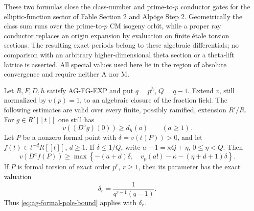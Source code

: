 These two formulas close the class-number and prime-to-$p$
conductor gates for the elliptic-function sector of Fable
Section 2 and Alp\"oge Step 2. Geometrically the class sum
runs over the prime-to-$p$ CM isogeny orbit, while a proper
ray conductor replaces an origin expansion by evaluation on
finite \'etale torsion sections. The resulting exact periods
belong to these algebraic differentials; no comparison with
an arbitrary higher-dimensional theta section or a theta-lift
lattice is asserted. All special values used here lie in the
region of absolute convergence and require neither A nor M.

\begin{proposition}
Let $R,F,D,h$ satisfy AG-FG-EXP and put $q=p^h$, $Q=q-1$.
Extend $v$, still normalized by $v(p)=1$, to an algebraic closure
of the fraction field. The following estimates are valid over
every finite, possibly ramified, extension $R'/R$.
For $g\in R'[[t]]$ one still has
\[
 v((D^ag)(0))\ge d_h(a)\qquad(a\ge1).
\]
Let $P$ be a nonzero formal point with $\delta=v(t(P))>0$,
and let $f(t)\in t^{-d}R[[t]]$, $d\ge1$. If
$\delta\le1/Q$, write $a-1=\kappa Q+\eta$,
$0\le\eta<Q$. Then
\begin{equation}\label{eq:ag-formal-pole-bound}
 v(D^af(P))\ge
 \max\left\{-(a+d)\delta,\quad
       v_p(a!)-\kappa-(\eta+d+1)\delta\right\}.
\end{equation}
If $P$ is formal torsion of exact order $p^r$, $r\ge1$,
then its parameter has the exact valuation
\[
 \delta_r=\frac1{q^{r-1}(q-1)}.
\]
Thus \eqref{eq:ag-formal-pole-bound} applies with $\delta_r$.
\end{proposition}
